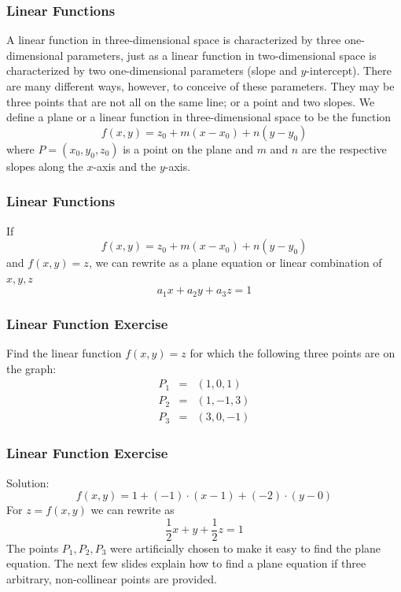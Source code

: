 \documentclass[xcolor=dvipsnames]{beamer}
\begin{document}
\begin{frame}
  \frametitle{Linear Functions}
  A linear function in three-dimensional space is characterized by
  three one-dimensional parameters, just as a linear function in
  two-dimensional space is characterized by two one-dimensional
  parameters (slope and $y$-intercept). There are many different ways,
  however, to conceive of these parameters. They may be three points
  that are not all on the same line; or a point and two slopes. We
  define a plane or a linear function in three-dimensional space
  to be the function
  \begin{equation}
    \label{eq:oohuthah}
    f(x,y)=z_{0}+m(x-x_{0})+n(y-y_{0})
  \end{equation}
where $P=(x_{0},y_{0},z_{0})$ is a point on the plane and $m$ and $n$
are the respective slopes along the $x$-axis and the $y$-axis.
\end{frame}

\begin{frame}
  \frametitle{Linear Functions}
  If
  \begin{equation}
    \label{eq:xaeleedu}
    f(x,y)=z_{0}+m(x-x_{0})+n(y-y_{0})
  \end{equation}
  and $f(x,y)=z$, we can rewrite as a plane equation or linear
  combination of $x,y,z$
  \begin{equation}
    \label{eq:oojaecux}
    a_{1}x+a_{2}y+a_{3}z=1
  \end{equation}
\end{frame}

\begin{frame}
  \frametitle{Linear Function Exercise}
  {\ubung} Find the linear function $f(x,y)=z$ for which the following three points are on
  the graph:
  \begin{equation}
    \label{eq:oareequu}
    \begin{array}{rcl}
      P_{1}&=&(1,0,1) \\
      P_{2}&=&(1,-1,3) \\
      P_{3}&=&(3,0,-1)
    \end{array}
  \end{equation}
\end{frame}

\begin{frame}
  \frametitle{Linear Function Exercise}
  Solution:
  \begin{equation}
    \label{eq:hieladai}
    f(x,y)=1+(-1)\cdot(x-1)+(-2)\cdot(y-0)
  \end{equation}
  For $z=f(x,y)$ we can rewrite as
  \begin{equation}
    \label{eq:otaipahf}
    \frac{1}{2}x+y+\frac{1}{2}z=1
  \end{equation}
  The points $P_{1},P_{2},P_{3}$ were artificially chosen to make it
  easy to find the plane equation. The next few slides explain how to
  find a plane equation if three arbitrary, non-collinear points are
  provided.
\end{frame}
\end{document}

